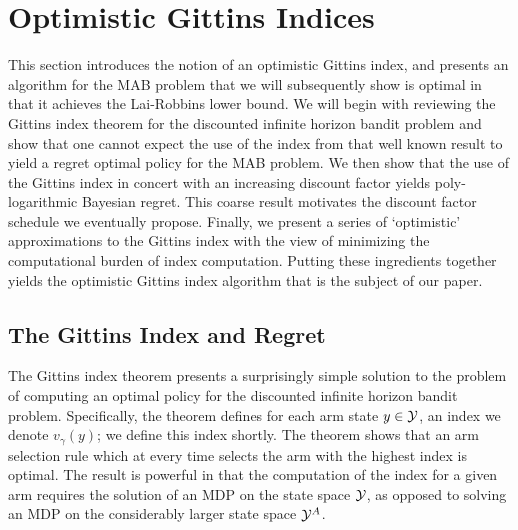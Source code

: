 \section{Optimistic Gittins Indices} \label{sec:gittins_and_approx}

This section introduces the notion of an optimistic Gittins index, and presents an algorithm for the MAB problem that we will subsequently show is optimal in that it achieves the Lai-Robbins lower bound. We will begin with reviewing the Gittins index theorem for the discounted infinite horizon bandit problem and show that one cannot expect the use of the index from that well known result to yield a regret optimal policy for the MAB problem. We then show that the use of the Gittins index in concert with an increasing discount factor yields poly-logarithmic Bayesian regret. This coarse result motivates the discount factor schedule we eventually propose. Finally, we present a series of `optimistic' approximations to the Gittins index with the view of minimizing the computational burden of index computation. Putting these ingredients together yields the optimistic Gittins index algorithm that is the subject of our paper. 

\subsection{The Gittins Index and Regret}

The Gittins index theorem presents a surprisingly simple solution to the problem of computing an optimal policy for the discounted infinite horizon bandit problem. Specifically, the theorem defines for each arm state $y \in \mathcal Y$, an index we denote $v_\gamma(y)$; we define this index shortly. The theorem shows that an arm selection rule which at every time selects the arm with the highest index is optimal. The result is powerful in that the computation of the index for a given arm requires the solution of an MDP on the state space $\mathcal Y$, as opposed to solving an MDP on the considerably larger state space $\mathcal Y^A$. 

